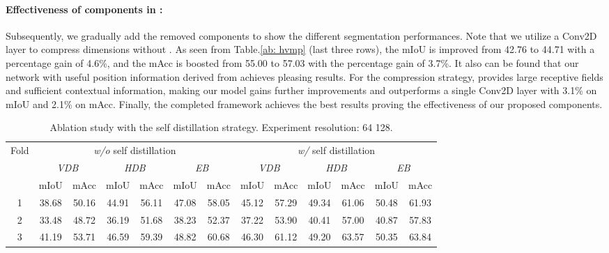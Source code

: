 \documentclass[runningheads]{llncs}
\begin{document}
	\paragraph{Effectiveness of components in :} Subsequently, we gradually add the removed components to show the different segmentation performances.
	Note that we utilize a Conv2D layer to compress dimensions without .
As seen from Table.\ref{ab: hvmp} (last three rows), the mIoU is improved from 42.76 to 44.71 with a percentage gain of 4.6\%, and the mAcc is boosted from 55.00 to 57.03 with the percentage gain of 3.7\%.
	It also can be found that our network with useful position information derived from  achieves pleasing results.
	For the compression strategy,  provides large receptive fields and sufficient contextual information, making our model gains further improvements and outperforms a single Conv2D layer with 3.1\% on mIoU and 2.1\% on mAcc.
	Finally, the completed framework achieves the best results proving the effectiveness of our proposed components.
	
	
	
	\setlength{\tabcolsep}{0.65mm}
	\begin{table}[t]
		\begin{center}
			\renewcommand{\arraystretch}{1}
			\caption{Ablation study with the self distillation strategy.
				Experiment resolution: 64  128.}
			\label{ab: sd}
			\begin{tabular}{c|cc|cc|cc||cc|cc|cc}
				\hline
				\multirow{3}{*}{Fold} & \multicolumn{6}{c||}{\emph{w/o} self distillation} & \multicolumn{6}{c}{\emph{w/} self distillation} \\  \cline{2-13}
				& \multicolumn{2}{c|}{\emph{VDB}} & \multicolumn{2}{c|}{\emph{HDB}} & \multicolumn{2}{c||}{\emph{EB}} & \multicolumn{2}{c|}{\emph{VDB}} & \multicolumn{2}{c|}{\emph{HDB}} & \multicolumn{2}{c}{\emph{EB}} \\ \cline{2-13}
				& mIoU & mAcc & mIoU & mAcc & mIoU & mAcc & mIoU &mAcc & mIoU &mAcc & mIoU & mAcc \\
				\hline\hline
				1 & 38.68 & 50.16 & 44.91 & 56.11 & 47.08 & 58.05 & 45.12 & 57.29 & 49.34 & 61.06 & 50.48 & 61.93 \\
				2 & 33.48 & 48.72 & 36.19 & 51.68 & 38.23 & 52.37 & 37.22 & 53.90 & 40.41 & 57.00 & 40.87 & 57.83 \\
				3 & 41.19 & 53.71 & 46.59 & 59.39 & 48.82 & 60.68 & 46.30 & 61.12 & 49.20 & 63.57 & 50.35 & 63.84 \\
\hline
			\end{tabular}
		\end{center}
	\end{table}
	
\end{document}
